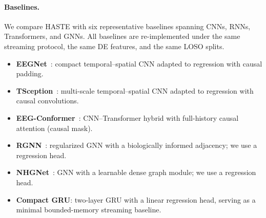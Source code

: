 \documentclass[preprint,12pt]{elsarticle}
\begin{document}
\begin{table}[!t]
\centering
\caption{Summary of the three evaluation datasets.}
\label{tab:dataset_summary}
\renewcommand{\arraystretch}{1.12}
\setlength{\tabcolsep}{3pt} 
\end{table}
\paragraph{Baselines.}
We compare HASTE with six representative baselines spanning CNNs, RNNs, Transformers, and GNNs.
All baselines are re-implemented under the same streaming protocol, the same DE features, and the same LOSO splits.
\begin{itemize}
  \item \textbf{EEGNet}~\cite{Lawhern2018EEGNet}: compact temporal--spatial CNN adapted to regression with causal padding.
  \item \textbf{TSception}~\cite{ding2023tsception}: multi-scale temporal--spatial CNN adapted to regression with causal convolutions.
  \item \textbf{EEG-Conformer}~\cite{song2023eeg}: CNN--Transformer hybrid with full-history causal attention (causal mask).
  \item \textbf{RGNN}~\cite{zhong2020rgnn}: regularized GNN with a biologically informed adjacency; we use a regression head.
  \item \textbf{NHGNet}~\cite{xu2025nhgnet}: GNN with a learnable dense graph module; we use a regression head.
  \item \textbf{Compact GRU}: two-layer GRU with a linear regression head, serving as a minimal bounded-memory streaming baseline.
\end{itemize}
\end{document}
